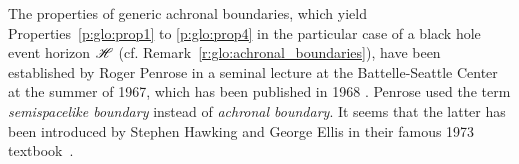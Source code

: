 \begin{hist}
\label{h:glo:BH_properties}
The properties of generic achronal boundaries,
which yield Properties~\ref{p:glo:prop1} to \ref{p:glo:prop4} in the particular
case of a black hole event horizon $\mathscr{H}$ (cf. Remark~\ref{r:glo:achronal_boundaries}),
have been established by
Roger Penrose in a seminal lecture at the Battelle-Seattle Center
at the summer of 1967, which has been published in 1968 \cite{Penro68}. Penrose used
the term \emph{semispacelike boundary} instead of \emph{achronal boundary}. It
seems that the latter has been introduced by Stephen Hawking and George Ellis in their famous 1973 textbook~\cite{HawkiE73}.
\end{hist}

